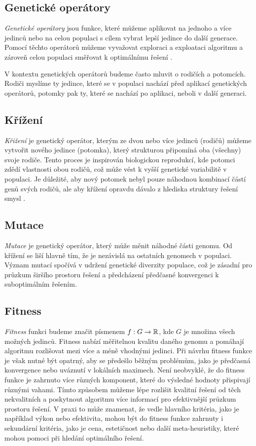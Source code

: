 \subsection{Genetické operátory}
\emph{Genetické operátory} jsou funkce, které můžeme aplikovat na jednoho a více jedinců nebo na celou populaci s cílem vybrat lepší jedince do další generace. Pomocí těchto operátorů můžeme vyvažovat exploraci a exploataci algoritmu a zároveň celou populaci směřovat k optimálnímu řešení \cite{EibenSmith2015}.

V kontextu genetických operátorů budeme často mluvit o rodičích a potomcích. Rodiči myslíme ty jedince, které se v populaci nachází před aplikací genetických operátorů, potomky pak ty, které se nachází po aplikaci, neboli v další generaci. 

\subsection{Křížení}
\emph{Křižení} je genetický operátor, kterým ze dvou nebo více jedinců (rodičů) můžeme vytvořit nového jedince (potomka), který strukturou připomíná oba (všechny) svoje rodiče. Tento proces je inspirován biologickou reprodukcí, kde potomci zdědí vlastnosti obou rodičů, což může vést k vyšší genetické variabilitě v populaci. Je důležité, aby nový potomek nebyl pouze náhodnou kombinací částí genů svých rodičů, ale aby křížení opravdu dávalo z hlediska struktury řešení smysl \cite{Jones1995Crossover}.

\subsection{Mutace}
\emph{Mutace} je genetický operátor, který může měnit náhodné části genomu. Od křížení se liší hlavně tím, že je nezávislá na ostatních genomech v populaci. Význam mutací spočívá v udržení genetické diverzity populace, což je zásadní pro průzkum širšího prostoru řešení a předcházení předčasné konvergenci k suboptimálním řešením.

\subsection{Fitness}
\emph{Fitness} funkci budeme značit písmenem $f: G \rightarrow \mathbb{R}$, kde $G$ je množina všech možných jedinců. Fitness nabízí měřitelnou kvalitu daného genomu a pomáhají algoritmu rozlišovat mezi více a méně vhodnými jedinci. Při návrhu fitness funkce je však nutné být opatrný, aby se předešlo běžným problémům, jako je předčasná konvergence nebo uváznutí v lokálních maximech. Není neobvyklé, že do fitness funkce je zahrnuto více různých komponent, které do výsledné hodnoty přispivají různými vahami. Tímto způsobem můžeme lépe rozlišit kvalitní řešení od těch nekvalitních a poskytnout algoritmu více informací pro efektivnější průzkum prostoru řešení. V praxi to může znamenat, že vedle hlavního kritéria, jako je například výkon nebo efektivita, mohou být do fitness funkce zahrnuty i sekundární kritéria, jako je cena, estetičnost nebo další meta-heuristiky, které mohou pomoci při hledání optimálního řešení.

